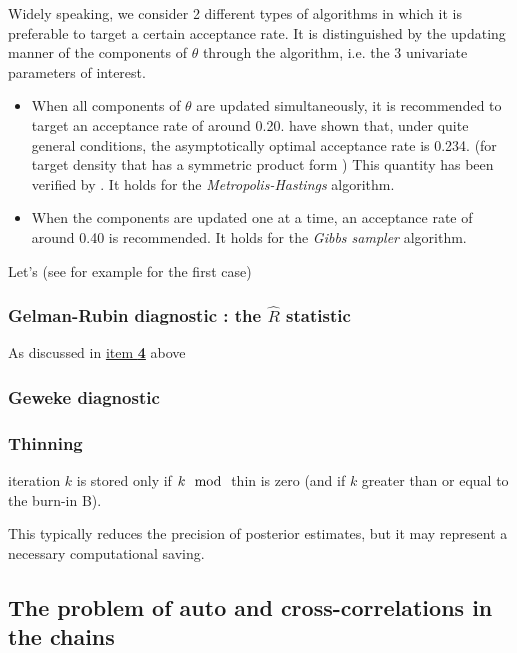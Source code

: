 Widely speaking, we consider 2 different  types of algorithms in which it is preferable to target a certain acceptance rate. It is distinguished by the updating manner of the components of $\theta$ through the algorithm, i.e. the 3 univariate parameters of interest.


\begin{itemize}
	\item When all components of $\theta$ are updated simultaneously, it is recommended to target an acceptance rate of around 0.20.
	 \citet{Roberts_weak_1997} have shown that, under quite general conditions, the asymptotically optimal acceptance rate is 0.234. (for  target density that has a symmetric product form ) 
	This quantity has been verified by \citet{Sherlock_optimal_2009}. It holds for the \emph{Metropolis-Hastings} algorithm.
	
	\item When the components are updated one at a time, an acceptance rate of around 0.40 is recommended. It holds for the\emph{ Gibbs sampler} algorithm. 
\end{itemize}

Let's  (see \citet{Bédard_optimal_2008} for example for the first case)



\subsubsection*{Gelman-Rubin diagnostic : the $\hat{R}$ statistic}

As discussed in \hyperref[convdiag4]{item \textbf{4}} above

\subsubsection*{Geweke diagnostic}



\subsubsection*{Thinning}

iteration $k$ is stored only if $k \mod$ thin is zero (and if $k$ greater than or equal to the burn-in B).

This typically reduces the precision of posterior estimates, but it may represent a necessary computational saving.


\subsection{The problem of auto and cross-correlations in the chains}


